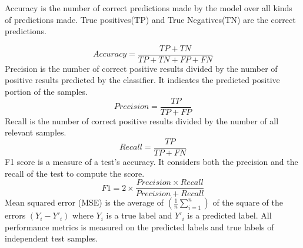 \documentclass{bioinfo}
\begin{document}
Accuracy is the number of correct predictions made by the model over all kinds of predictions made. 
True positives(TP) and True Negatives(TN) are the correct predictions. 

    \begin{equation}
        Accuracy = \frac{TP+TN}{TP+TN+FP+FN}
    \end{equation}
    Precision is the number of correct positive results divided by the number of positive results predicted by the classifier. It indicates the predicted positive portion of the samples. 
    \begin{equation}
        Precision = \frac{TP}{TP+FP}
    \end{equation}
    Recall is the number of correct positive results divided by the number of all relevant samples.
    \begin{equation}
        Recall = \frac{TP}{TP+FN}
    \end{equation}
	F1 score is a measure of a test's accuracy. It considers both the precision and the recall of the test to compute the score.
	\begin{equation}
        F1 = 2 \times \frac{Precision \times Recall}{Precision + Recall}
    \end{equation}
    Mean squared error (MSE) is the average of $(\frac{1}{n} \sum _{i=1} ^n)$ of the square of the errors $(Y_i - Y'_i)$ where $Y_i$ is a true label and $Y'_i$ is a predicted label. All performance metrics is measured on the predicted labels and true labels of independent test samples. 
\end{document}
